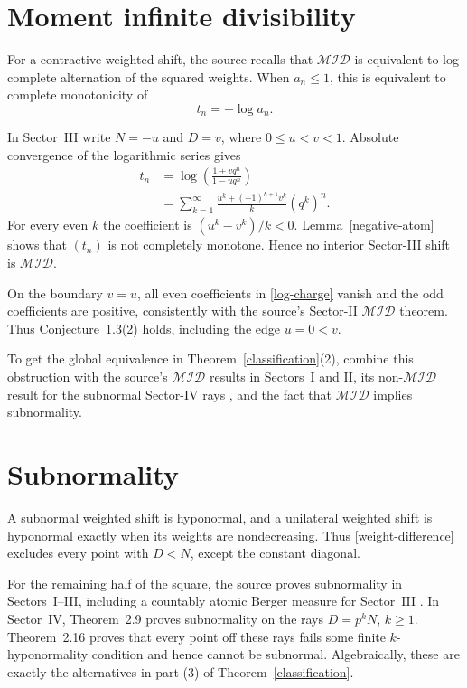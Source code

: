 \documentclass[11pt]{article}
\newcommand{\MID}{\mathcal{MID}}
\begin{document}
\section{Moment infinite divisibility}

For a contractive weighted shift, the source recalls that $\MID$ is equivalent
to log complete alternation of the squared weights.  When $a_n\leq1$, this is
equivalent to complete monotonicity of
\[
 t_n=-\log a_n.
\]

In Sector~III write $N=-u$ and $D=v$, where $0\leq u<v<1$.  Absolute
convergence of the logarithmic series gives
\begin{align}\label{log-charge}
 t_n
 &=\log\!\left(\frac{1+vq^n}{1-uq^n}\right)\\
 &=\sum_{k=1}^\infty
 \frac{u^k+(-1)^{k+1}v^k}{k}(q^k)^n.
\end{align}
For every even $k$ the coefficient is
$(u^k-v^k)/k<0$.  Lemma~\ref{negative-atom} shows that $(t_n)$ is not
completely monotone.  Hence no interior Sector-III shift is $\MID$.

On the boundary $v=u$, all even coefficients in \eqref{log-charge} vanish
and the odd coefficients are positive, consistently with the source's
Sector-II $\MID$ theorem.  Thus Conjecture~1.3(2) holds, including the edge
$u=0<v$.

To get the global equivalence in Theorem~\ref{classification}(2), combine
this obstruction with the source's $\MID$ results in Sectors~I and II, its
non-$\MID$ result for the subnormal Sector-IV rays
\cite[Theorem~2.9]{GRWS}, and the fact that $\MID$ implies subnormality.

\section{Subnormality}

A subnormal weighted shift is hyponormal, and a unilateral weighted shift is
hyponormal exactly when its weights are nondecreasing.  Thus
\eqref{weight-difference} excludes every point with $D<N$, except the
constant diagonal.

For the remaining half of the square, the source proves subnormality in
Sectors~I--III, including a countably atomic Berger measure for Sector~III
\cite[Theorem~2.8]{GRWS}.  In Sector~IV, Theorem~2.9 proves subnormality on
the rays $D=p^kN$, $k\geq1$.  Theorem~2.16 proves that every point off these
rays fails some finite $k$-hyponormality condition and hence cannot be
subnormal.  Algebraically, these are exactly the alternatives in part (3) of
Theorem~\ref{classification}.
\end{document}
